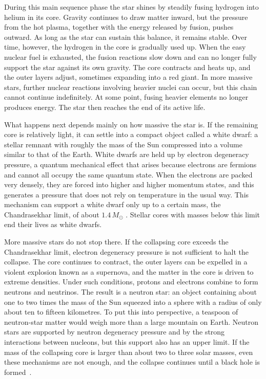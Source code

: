 During this main sequence phase the star shines by steadily fusing hydrogen
into helium in its core. Gravity continues to draw matter inward, but the
pressure from the hot plasma, together with the energy released by fusion,
pushes outward. As long as the star can sustain this balance, it remains
stable. Over time, however, the hydrogen in the core is gradually used up. When
the easy nuclear fuel is exhausted, the fusion reactions slow down and can no
longer fully support the star against its own gravity. The core contracts and
heats up, and the outer layers adjust, sometimes expanding into a red giant. In
more massive stars, further nuclear reactions involving heavier nuclei can
occur, but this chain cannot continue indefinitely. At some point, fusing
heavier elements no longer produces energy. The star then reaches the end of
its active life.

What happens next depends mainly on how massive the star is. If the remaining
core is relatively light, it can settle into a compact object called a white
dwarf: a stellar remnant with roughly the mass of the Sun compressed into a
volume similar to that of the Earth. White dwarfs are held up by electron
degeneracy pressure, a quantum mechanical effect that arises because electrons
are fermions and cannot all occupy the same quantum state. When the electrons
are packed very densely, they are forced into higher and higher momentum
states, and this generates a pressure that does not rely on temperature in the
usual way. This mechanism can support a white dwarf only up to a certain mass,
the Chandrasekhar limit, of about \(1.4\,M_{\odot}\) \cite{chandrasekhar1931}.
Stellar cores with masses below this limit end their lives as white dwarfs.

More massive stars do not stop there. If the collapsing core exceeds the
Chandrasekhar limit, electron degeneracy pressure is not sufficient to halt the
collapse. The core continues to contract, the outer layers can be expelled in a
violent explosion known as a supernova, and the matter in the core is driven to
extreme densities. Under such conditions, protons and electrons combine to form
neutrons and neutrinos. The result is a neutron star: an object containing about
one to two times the mass of the Sun squeezed into a sphere with a radius of
only about ten to fifteen kilometres. To put this into perspective, a teaspoon
of neutron-star matter would weigh more than a large mountain on Earth. Neutron
stars are supported by neutron degeneracy pressure and by the strong
interactions between nucleons, but this support also has an upper limit. If the
mass of the collapsing core is larger than about two to three solar masses, even
these mechanisms are not enough, and the collapse continues until a black hole
is formed~\cite{oppenheimer1939,LattimerPrakash2004}.

